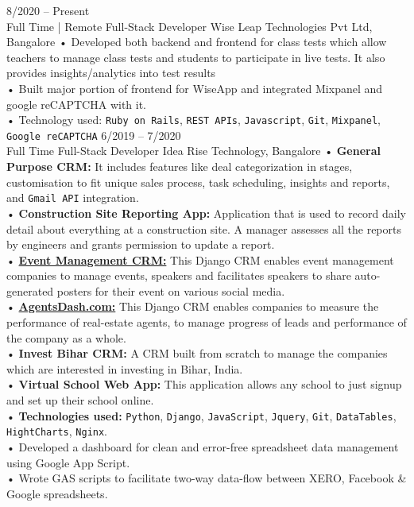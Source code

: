 \documentclass[8pt]{developercv} %
\begin{document}
\begin{entrylist}
	\entry
		{8/2020 -- Present \\\footnotesize{Full Time | Remote}}
		{Full-Stack Developer}
		{Wise Leap Technologies Pvt Ltd, Bangalore}
		{• Developed both backend and frontend for class tests which allow teachers to manage class tests and students to participate in live tests. It also provides insights/analytics into test results\\• Built major portion of frontend for WiseApp and integrated Mixpanel and google reCAPTCHA with it.\\• Technology used: \texttt{Ruby on Rails}, \texttt{REST APIs}, \texttt{Javascript}, \texttt{Git}, \texttt{Mixpanel}, \texttt{Google reCAPTCHA}}
	\entry
		{6/2019 -- 7/2020\\\footnotesize{Full Time}}
		{Full-Stack Developer}
		{Idea Rise Technology, Bangalore}
		{• \textbf{General Purpose CRM:} It includes features like deal categorization in stages, customisation to fit unique sales process, task scheduling, insights and reports, and \texttt{Gmail API} integration.\\• \textbf{Construction Site Reporting App:} Application that is used to record daily detail about everything at a construction site. A manager assesses all the reports by engineers and grants permission to update a report.\\• \href{https://eventage.pythonanywhere.com}{\textbf{Event Management CRM:}} This Django CRM enables event management companies to manage events, speakers and facilitates speakers to share auto-generated posters for their event on various social media. \\• \href{https://agentsdash.com}{\textbf{AgentsDash.com:}} This Django CRM enables companies to measure the performance of real-estate agents, to manage progress of leads and performance of the company as a whole. \\• \textbf{Invest Bihar CRM:} A CRM built from scratch to manage the companies which are interested in investing in Bihar, India. \\• \textbf{Virtual School Web App:} This application allows any school to just signup and set up their school online.\\• \textbf{Technologies used:} \texttt{Python}, \texttt{Django}, \texttt{JavaScript}, \texttt{Jquery}, \texttt{Git}, \texttt{DataTables}, \texttt{HightCharts}, \texttt{Nginx}. \\ • Developed a dashboard for clean and error-free spreadsheet data management using Google App Script.\\ • Wrote GAS scripts to facilitate two-way data-flow between XERO, Facebook \& Google spreadsheets.}

\end{entrylist}
\end{document}
